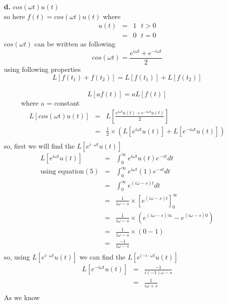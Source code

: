 \documentclass{article}
\begin{document}
\noindent \textbf{d.} $cos(\omega t)u(t)$\\
so here $f(t) = cos(\omega t)u(t)$
where
\begin{eqnarray}
u(t) & = & 1 \ \ \  t>0\\
& = & 0 \ \ \  t=0
\end{eqnarray}
$cos(\omega t)$ can be written as following\\
$$cos(\omega t) = \frac{e^{i\omega t} + e^{-i\omega t}}{2} $$
using following properties
$$ L[f(t_1) + f(t_2)] = L[f(t_1)] + L[f(t_2)] $$ \\
$$ L[af(t)] = aL[f(t)] $$ \ \ \ \ \ where a = constant \\
\begin{eqnarray}
L[cos(\omega t) u(t)] & = & L[\frac{e^{i\omega t} u(t) +  e^{-i\omega t} u(t)}{2}] \\
& = & \frac{1}{2}\times(L[e^{i\omega t} u(t)] + L[e^{-i\omega t} u(t)]) \\
\end{eqnarray}
so, first  we will find the $L[e^{i\cdot \omega t} u(t)]$ \\
\begin{eqnarray*}
L[e^{i\omega t} u(t)]  & = &  \int_0^\infty e^{i\omega t}u(t)e^{-st} dt \\
\mbox{using equation} (5)
 &=&  \int_0^\infty e^{i\omega t}(1)e^{-st} dt \\
 &=&  \int_0^\infty e^{(i\omega -s)t}dt \\
 &=&  \frac{1}{i\omega-s}\times [e^{(i\omega -s)t}]_0^\infty \\
 &=&  \frac{1}{i\omega-s}\times(e^{(i \omega -s)\infty} -e^{(i\omega -s)0}) \\
 &=&  \frac{1}{i\omega-s}\times( 0 - 1 ) \\
 &=& \frac{-1}{i\omega-s} \\
\end{eqnarray*}
so, using $L[e^{i\cdot \omega t} u(t)]$  we can find the $L[e^{(-i\cdot \omega t} u(t)]$ \\
\begin{eqnarray*}
L[e^{-i\omega t} u(t)]  & = &  \frac{-1}{i(-1)\omega-s} \\
&=&  \frac{1}{i\omega+s} \\
\end{eqnarray*}
As we know
\end{document}
